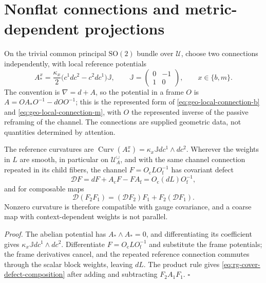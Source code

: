 \section{Nonflat connections and metric-dependent projections}
\label{sec:rg-cover-connections}

On the trivial common principal \(\mathrm{SO}(2)\) bundle over \(\mathcal U\),
choose two connections independently, with local reference potentials
\begin{equation}
 A^x_*=\frac{\kappa_x}{2}\bigl(c^1dc^2-c^2dc^1\bigr)\mathbb J,\qquad
 \mathbb J=\begin{pmatrix}0&-1\\1&0\end{pmatrix},\qquad x\in\{b,m\}.
\label{eq:rg-cover-nonflat-potential}
\end{equation}
The convention is \(\nabla=d+A\), so the potential in a frame \(O\) is
\(A=OA_*O^{-1}-dOO^{-1}\); this is the represented form of
\eqref{eq:geo-local-connection-b} and \eqref{eq:geo-local-connection-m}, with
\(O\) the represented inverse of the passive reframing of the channel. The
connections are supplied geometric data, not quantities determined by attention.

The reference curvatures are
\(\operatorname{Curv}(A^x_*)=\kappa_x\mathbb Jdc^1\wedge dc^2\). Wherever the weights
in \(L\) are smooth, in particular on \(\mathcal U_A^{\cup}\), and with the same
channel connection repeated in its child fibers, the channel
\(F=O_{\mathrm c}LO_{\mathrm f}^{-1}\) has covariant defect
\begin{equation}
 \mathcal DF=dF+A_{\mathrm c}F-FA_{\mathrm f}
   =O_{\mathrm c}(dL)O_{\mathrm f}^{-1},
\label{eq:rg-cover-connection-defect}
\end{equation}
and for composable maps
\begin{equation}
 \mathcal D(F_2F_1)=(\mathcal DF_2)F_1+F_2(\mathcal DF_1).
\label{eq:rg-cover-defect-composition}
\end{equation}
Nonzero curvature is therefore compatible with gauge covariance, and a coarse map
with context-dependent weights is not parallel. 

\noindent\emph{Proof.}
The abelian potential has \(A_*\wedge A_*=0\), and differentiating its
coefficient gives \(\kappa_x\mathbb Jdc^1\wedge dc^2\). Differentiate
\(F=O_{\mathrm c}LO_{\mathrm f}^{-1}\) and substitute the frame potentials; the
frame derivatives cancel, and the repeated reference connection commutes through
the scalar block weights, leaving \(dL\). The product rule gives
\eqref{eq:rg-cover-defect-composition} after adding and subtracting
\(F_2A_1F_1\). \(\square\)

